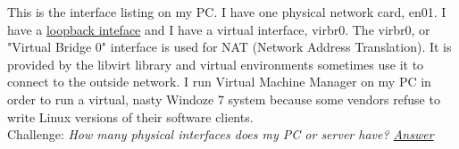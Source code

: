 This is the interface listing on my PC. I have one physical network card, en01. I have a \href{http://www.tldp.org/LDP/nag/node66.html}{loopback inteface} and I have a virtual interface, virbr0. The virbr0, or "Virtual Bridge 0" interface is used for NAT (Network Address Translation). It is provided by the libvirt library and virtual environments sometimes use it to connect to the outside network. I run Virtual Machine Manager on my PC in order to run a virtual, nasty Windoze 7 system because some vendors refuse to write Linux versions of their software clients.\\

Challenge: \textit{How many physical interfaces does my PC or server have? \hyperlink{numints}{Answer}}



